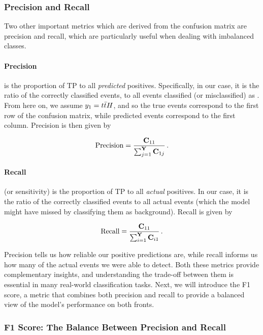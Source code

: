 \subsubsection{Precision and Recall}

Two other important metrics which are derived from the confusion matrix are precision and recall, which are particularly
useful when dealing with imbalanced classes.

\paragraph{Precision} is the proportion of TP to all \emph{predicted} positives. Specifically, in our case, it is the
ratio of the correctly classified \tth events, to all events classified (or misclassified) as \tth. From here on, we
assume $y_1 = {t\bar{t}H}$, and so the true \tth events correspond to the first row of the confusion matrix, while predicted
\tth events correspond to the first column. Precision is then given by

\begin{align}
    \text{Precision} = \frac{\mathbf{C}_{11}}{\sum_{j=1}^{\textbf{Y}} \mathbf{C}_{1j}}\,.
\end{align}

\paragraph{Recall} (or sensitivity) is the proportion of TP to all \emph{actual} positives. In our case, it is the ratio
of the correctly classified \tth events to all actual \tth events (which the model might have missed by classifying them
as background). Recall is given by

\begin{align}
    \text{Recall} = \frac{\mathbf{C}_{11}}{\sum_{i=1}^{\textbf{Y}} \mathbf{C}_{i1}}\,.
\end{align}

Precision tells us how reliable our positive predictions are,
while recall informs us how many of the actual \tth events we were able to detect. Both these metrics provide
complementary insights, and understanding the trade-off between them is essential in many real-world classification
tasks. Next, we will introduce the F1 score, a metric that combines both precision and recall to provide a balanced view
of the model's performance on both fronts.

\subsubsection{F1 Score: The Balance Between Precision and Recall}

